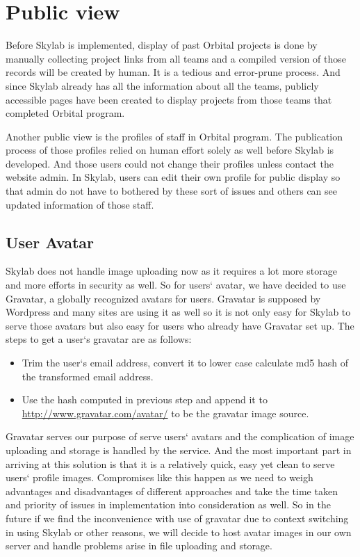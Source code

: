 \chapter{Public view} \label{publicprofile}

Before Skylab is implemented, display of past Orbital projects is done by manually collecting project links from all teams and a compiled version of those records will be created by human. It is a tedious and error-prune process. And since Skylab already has all the information about all the teams, publicly accessible pages have been created to display projects from those teams that completed Orbital program.

Another public view is the profiles of staff in Orbital program. The publication process of those profiles relied on human effort solely as well before Skylab is developed. And those users could not change their profiles unless contact the website admin. In Skylab, users can edit their own profile for public display so that admin do not have to bothered by these sort of issues and others can see updated information of those staff.

\section{User Avatar} \label{useravatar}

Skylab does not handle image uploading now as it requires a lot more storage and more efforts in security as well. So for users` avatar, we have decided to use Gravatar, a globally recognized avatars for users\cite{citationgravatar}. Gravatar is supposed by Wordpress and many sites are using it as well so it is not only easy for Skylab to serve those avatars but also easy for users who already have Gravatar set up. The steps to get a user`s gravatar are as follows:

\begin{itemize}
  \item Trim the user`s email address, convert it to lower case calculate md5 hash of the transformed email address.
  \item Use the hash computed in previous step and append it to \url{http://www.gravatar.com/avatar/} to be the gravatar image source.
\end{itemize}

Gravatar serves our purpose of serve users` avatars and the complication of image uploading and storage is handled by the service. And the most important part in arriving at this solution is that it is a relatively quick, easy yet clean to serve users` profile images. Compromises like this happen as we need to weigh advantages and disadvantages of different approaches and take the time taken and priority of issues in implementation into consideration as well. So in the future if we find the inconvenience with use of gravatar due to context switching in using Skylab or other reasons, we will decide to host avatar images in our own server and handle problems arise in file uploading and storage.
